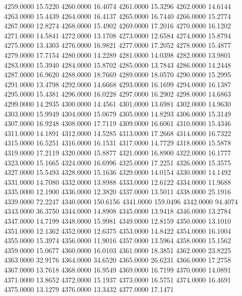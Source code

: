 4259.0000     15.5220
4260.0000     16.4074
4261.0000     15.3296
4262.0000     14.6144
4263.0000     15.4439
4264.0000     16.4137
4265.0000     16.7440
4266.0000     15.2774
4267.0000     12.8274
4268.0000     15.4902
4269.0000     17.2016
4270.0000     16.1202
4271.0000     14.5841
4272.0000     13.1708
4273.0000     12.6584
4274.0000     15.8794
4275.0000     13.4303
4276.0000     16.9821
4277.0000     17.2052
4278.0000     15.4877
4279.0000     17.7154
4280.0000     14.2289
4281.0000     14.0398
4282.0000     13.9801
4283.0000     15.3940
4284.0000     15.8702
4285.0000     13.7843
4286.0000     14.2448
4287.0000     16.9620
4288.0000     18.7669
4289.0000     18.0570
4290.0000     15.2995
4291.0000     13.4798
4292.0000     14.6668
4293.0000     16.1699
4294.0000     16.1387
4295.0000     15.4381
4296.0000     16.0228
4297.0000     16.2902
4298.0000     14.6863
4299.0000     14.2935
4300.0000     14.4561
4301.0000     13.6981
4302.0000     14.9630
4303.0000     15.9949
4304.0000     15.0679
4305.0000     14.8293
4306.0000     15.3149
4307.0000     16.9248
4308.0000     17.7119
4309.0000     16.6061
4310.0000     15.4346
4311.0000     14.1891
4312.0000     14.5285
4313.0000     17.2668
4314.0000     16.7322
4315.0000     16.5251
4316.0000     16.1531
4317.0000     14.7729
4318.0000     15.5878
4319.0000     17.2119
4320.0000     15.8877
4321.0000     16.8900
4322.0000     16.1777
4323.0000     15.1665
4324.0000     16.6996
4325.0000     17.2251
4326.0000     15.3575
4327.0000     15.5493
4328.0000     15.1636
4329.0000     14.0154
4330.0000     14.1492
4331.0000     14.7080
4332.0000     13.8988
4333.0000     12.6122
4334.0000     11.9688
4335.0000     12.1900
4336.0000     12.3820
4337.0000     13.5011
4338.0000     25.1916
4339.0000     72.2247
4340.0000    150.6156
4341.0000    159.0496
4342.0000     94.4074
4343.0000     36.3750
4344.0000     14.8908
4345.0000     13.9418
4346.0000     13.2784
4347.0000     14.7199
4348.0000     15.9981
4349.0000     12.8159
4350.0000     13.1010
4351.0000     12.1362
4352.0000     12.6375
4353.0000     14.8422
4354.0000     16.1004
4355.0000     15.3974
4356.0000     11.9016
4357.0000     13.5964
4358.0000     15.1562
4359.0000     15.0677
4360.0000     16.0103
4361.0000     18.3851
4362.0000     23.8225
4363.0000     32.9176
4364.0000     34.6520
4365.0000     26.6231
4366.0000     17.2758
4367.0000     13.7618
4368.0000     16.9549
4369.0000     16.7199
4370.0000     14.0891
4371.0000     13.8652
4372.0000     15.1937
4373.0000     16.5751
4374.0000     16.4691
4375.0000     13.1279
4376.0000     13.3432
4377.0000     17.1471
